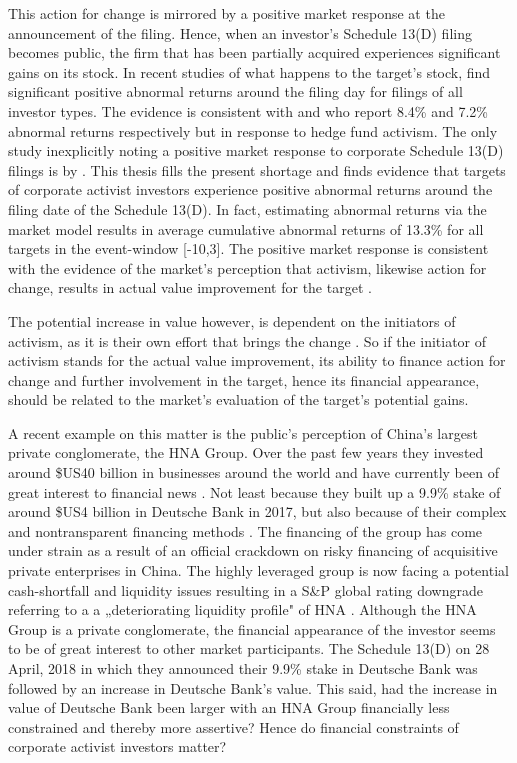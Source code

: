 \documentclass[12pt]{article}
\begin{document}
This action for change is mirrored by a positive market response at the announcement of the filing. Hence, when an investor's Schedule 13(D) filing becomes public, the firm that has been partially acquired experiences significant gains on its stock. In recent studies of what happens to the target's stock, \citet[p.1564]{Collin-Dufresne2015} find significant positive abnormal returns around the filing day for filings of all investor types. The evidence is consistent with \citet[p.1756]{Brav2008} and \citet[p.209]{Klein2009} who report 8.4\% and 7.2\% abnormal returns respectively but in response to hedge fund activism. The only study inexplicitly noting a positive market response to corporate Schedule 13(D) filings is by \citet[p.29]{Brigida2012}. This thesis fills the present shortage and finds evidence that targets of corporate activist investors experience positive abnormal returns around the filing date of the Schedule 13(D). In fact, estimating abnormal returns via the market model results in average cumulative abnormal returns of 13.3\% for all targets in the event-window [-10,3]. The positive market response is consistent with the evidence of the market's perception that activism, likewise action for change, results in actual value improvement for the target \citep[p.1760]{Brav2008}.\par
The potential increase in value however, is dependent on the initiators of activism, as it is their own effort that brings the change \citep[p.1563]{Collin-Dufresne2015}. So if the initiator of activism stands for the actual value improvement, its ability to finance action for change and further involvement in the target, hence its financial appearance, should be related to the market's evaluation of the target's potential gains.\par
A recent example on this matter is the public's perception of China's largest private conglomerate, the HNA Group. Over the past few years they invested around \$US40 billion in businesses around the world and have currently been of great interest to financial news \citep{Smith2018}. Not least because they built up a 9.9\% stake of around \$US4 billion in Deutsche Bank in 2017, but also because of their complex and nontransparent financing methods \citep{Lockett2018}.
The financing of the group has come under strain as a result of an official crackdown on risky financing of acquisitive private enterprises in China. The highly leveraged group is now facing a potential cash-shortfall and liquidity issues resulting in a S\&P global rating downgrade referring to a a „deteriorating liquidity profile" of HNA \citep{Schuetze2018}. Although the HNA Group is a private conglomerate, the financial appearance of the investor seems to be of great interest to other market participants. The Schedule 13(D) on 28 April, 2018 in which they announced their 9.9\% stake in Deutsche Bank was followed by an increase in Deutsche Bank's value. This said, had the increase in value of Deutsche Bank been larger with an HNA Group financially less constrained and thereby more assertive? Hence do financial constraints of corporate activist investors matter?\par
\end{document}
